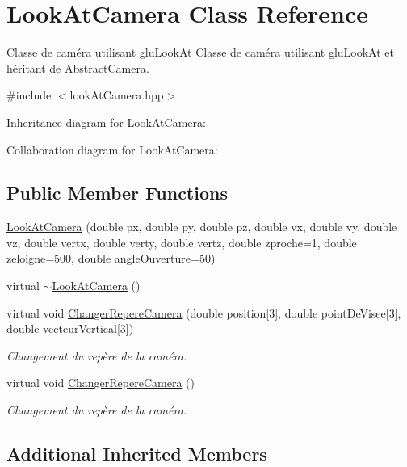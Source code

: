 \hypertarget{class_look_at_camera}{}\section{Look\+At\+Camera Class Reference}
\label{class_look_at_camera}


Classe de caméra utilisant glu\+Look\+At Classe de caméra utilisant glu\+Look\+At et héritant de \hyperlink{class_abstract_camera}{Abstract\+Camera}.  




{\ttfamily \#include $<$look\+At\+Camera.\+hpp$>$}



Inheritance diagram for Look\+At\+Camera\+:


Collaboration diagram for Look\+At\+Camera\+:
\subsection*{Public Member Functions}
\begin{DoxyCompactItemize}
\item 
\hyperlink{class_look_at_camera_a14d523ff4ea3cc37abf726e2ffd981ec}{Look\+At\+Camera} (double px, double py, double pz, double vx, double vy, double vz, double vertx, double verty, double vertz, double zproche=1, double zeloigne=500, double angle\+Ouverture=50)
\item 
virtual \hyperlink{class_look_at_camera_a88d62e1f68d1ccf9dd3a80fd951e3632}{$\sim$\+Look\+At\+Camera} ()
\item 
virtual void \hyperlink{class_look_at_camera_a0904e7cb4cc17c9d8dd54d8a394eb9cc}{Changer\+Repere\+Camera} (double position\mbox{[}3\mbox{]}, double point\+De\+Visee\mbox{[}3\mbox{]}, double vecteur\+Vertical\mbox{[}3\mbox{]})
\begin{DoxyCompactList}\small\item\em Changement du repère de la caméra. \end{DoxyCompactList}\item 
virtual void \hyperlink{class_look_at_camera_ac8ff2cf45773bf8f27fa9972e1f48c5d}{Changer\+Repere\+Camera} ()
\begin{DoxyCompactList}\small\item\em Changement du repère de la caméra. \end{DoxyCompactList}\end{DoxyCompactItemize}
\subsection*{Additional Inherited Members}


